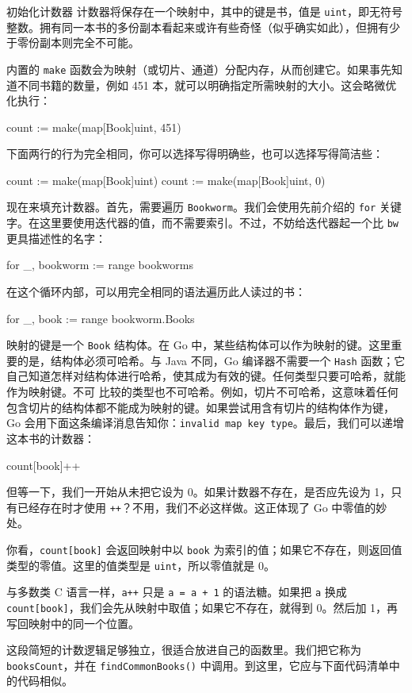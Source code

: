 \begin{infobox}{初始化计数器}
计数器将保存在一个映射中，其中的键是书，值是 \texttt{uint}，即无符号整数。拥有同一本书的多份副本看起来或许有些奇怪（似乎确实如此），但拥有少于零份副本则完全不可能。

内置的 \texttt{make} 函数会为映射（或切片、通道）分配内存，从而创建它。如果事先知道不同书籍的数量，例如 451 本，就可以明确指定所需映射的大小。这会略微优化执行：

\begin{gocode}[]
count := make(map[Book]uint, 451)
\end{gocode}

下面两行的行为完全相同，你可以选择写得明确些，也可以选择写得简洁些：

\begin{gocode}[]
count := make(map[Book]uint)
count := make(map[Book]uint, 0)
\end{gocode}

现在来填充计数器。首先，需要遍历 \texttt{Bookworm}。我们会使用先前介绍的 \texttt{for} 关键字。在这里要使用迭代器的值，而不需要索引。不过，不妨给迭代器起一个比 \texttt{bw} 更具描述性的名字：

\begin{gocode}[]
for _, bookworm := range bookworms {
}
\end{gocode}

在这个循环内部，可以用完全相同的语法遍历此人读过的书：

\begin{gocode}[]
for _, book := range bookworm.Books {
}
\end{gocode}

映射的键是一个 \texttt{Book} 结构体。在 Go 中，某些结构体可以作为映射的键。这里重要的是，结构体必须可哈希。与 Java 不同，Go 编译器不需要一个 \texttt{Hash} 函数；它自己知道怎样对结构体进行哈希，使其成为有效的键。任何类型只要可哈希，就能作为映射键。不可
比较的类型也不可哈希。例如，切片不可哈希，这意味着任何包含切片的结构体都不能成为映射的键。如果尝试用含有切片的结构体作为键，Go 会用下面这条编译消息告知你：\texttt{invalid map key type}。最后，我们可以递增这本书的计数器：

\begin{gocode}[]
count[book]++
\end{gocode}

但等一下，我们一开始从未把它设为 0。如果计数器不存在，是否应先设为 1，只有已经存在时才使用 \texttt{++}？不用，我们不必这样做。这正体现了 Go 中零值的妙处。

你看，\texttt{count[book]} 会返回映射中以 \texttt{book} 为索引的值；如果它不存在，则返回值类型的零值。这里的值类型是 \texttt{uint}，所以零值就是 0。

与多数类 C 语言一样，\texttt{a++} 只是 \texttt{a = a + 1} 的语法糖。如果把 \texttt{a} 换成 \texttt{count[book]}，我们会先从映射中取值；如果它不存在，就得到 0。然后加 1，再写回映射中的同一个位置。

这段简短的计数逻辑足够独立，很适合放进自己的函数里。我们把它称为 \texttt{booksCount}，并在 \texttt{findCommonBooks()} 中调用。到这里，它应与下面代码清单中的代码相似。
\end{infobox}

